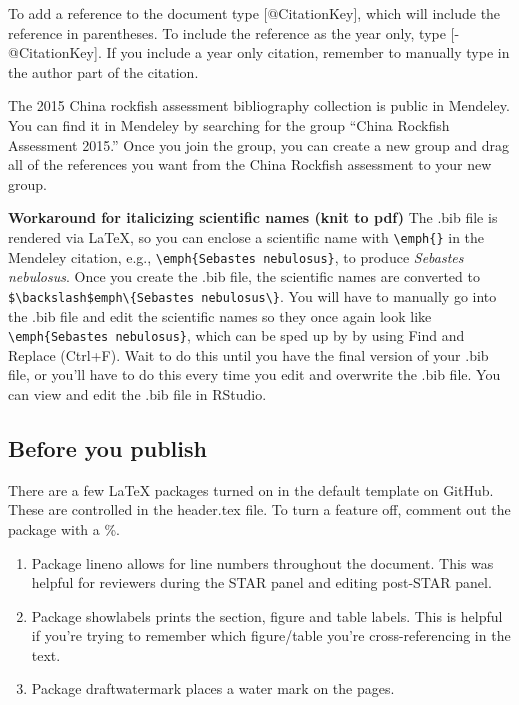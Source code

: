 \documentclass[12pt,]{article}
\begin{document}
To add a reference to the document type {[}@CitationKey{]}, which will
include the reference in parentheses. To include the reference as the
year only, type {[}-@CitationKey{]}. If you include a year only
citation, remember to manually type in the author part of the citation.

The 2015 China rockfish assessment bibliography collection is public in
Mendeley. You can find it in Mendeley by searching for the group ``China
Rockfish Assessment 2015.'' Once you join the group, you can create a
new group and drag all of the references you want from the China
Rockfish assessment to your new group.

\textbf{Workaround for italicizing scientific names (knit to pdf)} The
.bib file is rendered via \LaTeX, so you can enclose a scientific name
with \texttt{\textbackslash{}emph\{\}} in the Mendeley citation, e.g.,
\texttt{\textbackslash{}emph\{Sebastes\ nebulosus\}}, to produce
\emph{Sebastes nebulosus}. Once you create the .bib file, the scientific
names are converted to
\texttt{\$\textbackslash{}backslash\$emph\textbackslash{}\{Sebastes\ nebulosus\textbackslash{}\}}.
You will have to manually go into the .bib file and edit the scientific
names so they once again look like
\texttt{\textbackslash{}emph\{Sebastes\ nebulosus\}}, which can be sped
up by by using Find and Replace (Ctrl+F). Wait to do this until you have
the final version of your .bib file, or you'll have to do this every
time you edit and overwrite the .bib file. You can view and edit the
.bib file in RStudio.

\subsection{Before you publish}\label{before-you-publish}

There are a few LaTeX packages turned on in the default template on
GitHub. These are controlled in the header.tex file. To turn a feature
off, comment out the package with a \%.

\begin{enumerate}
\def\labelenumi{\arabic{enumi}.}
\item
  Package lineno allows for line numbers throughout the document. This
  was helpful for reviewers during the STAR panel and editing post-STAR
  panel.
\item
  Package showlabels prints the section, figure and table labels. This
  is helpful if you're trying to remember which figure/table you're
  cross-referencing in the text.
\item
  Package draftwatermark places a water mark on the pages.
\end{enumerate}
\end{document}
